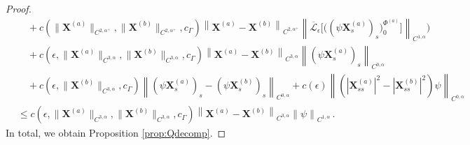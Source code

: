 \documentclass[11pt,reqno]{amsart}
\newcommand{\X}{\bm{X}}
\newcommand{\norm}[1]{\left\lVert #1 \right\rVert}
\newcommand{\mc}[1]{\mathcal{#1}}
\theoremstyle{definition}
\begin{document}
\begin{proof}
\begin{equation}
\begin{aligned}
&\quad + 
  c(\|\X^{(a)}\|_{C^{2,\alpha^+}},\|\X^{(b)}\|_{C^{2,\alpha^+}},c_\Gamma)\norm{\X^{(a)}-\X^{(b)}}_{C^{2,\alpha^+}}\norm{\overline{\mc{L}}_\epsilon\big[\big((\psi\X_s^{(a)})_s \big)_0^{\Phi^{(a)}}\big]}_{C^{1,\alpha}}\bigg)\\
%  
&\quad  + 
  c(\epsilon,\|\X^{(a)}\|_{C^{3,\alpha}},\|\X^{(b)}\|_{C^{3,\alpha}},c_\Gamma)\norm{\X^{(a)}-\X^{(b)}}_{C^{3,\alpha}}\norm{(\psi\X_s^{(a)})_s}_{C^{0,\alpha}} \\
&\quad +
  c(\epsilon,\|\X^{(b)}\|_{C^{3,\alpha}},c_\Gamma)\norm{(\psi\X_s^{(a)})_s-(\psi\X_s^{(b)})_s}_{C^{0,\alpha}} 
 + c(\epsilon)\norm{(|\X_{ss}^{(a)}|^2-|\X_{ss}^{(b)}|^2)\psi}_{C^{0,\alpha}}\\
&\le 
  c(\epsilon,\|\X^{(a)}\|_{C^{3,\alpha}},\|\X^{(b)}\|_{C^{3,\alpha}},c_\Gamma)\norm{\X^{(a)}-\X^{(b)}}_{C^{3,\alpha}}\norm{\psi}_{C^{1,\alpha}}\,.
\end{aligned}
\end{equation}
In total, we obtain Proposition \ref{prop:Qdecomp}. 
%
%
\end{proof}



\end{document}
